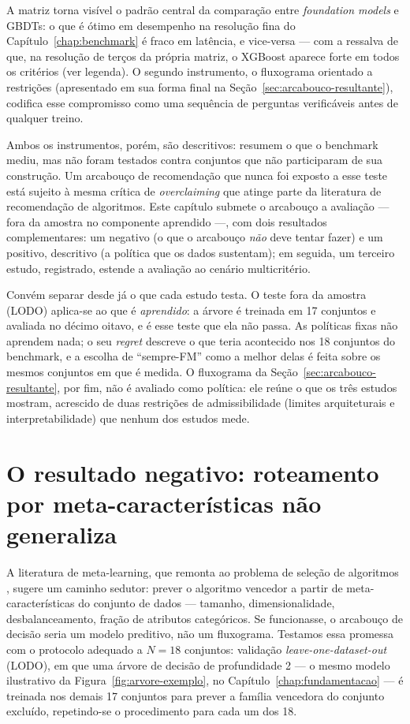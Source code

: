 A matriz torna visível o padrão central da comparação entre
\emph{foundation models} e GBDTs: o que é ótimo em desempenho na
resolução fina do Capítulo~\ref{chap:benchmark} é fraco em latência,
e vice-versa --- com a ressalva de que, na resolução de terços da
própria matriz, o XGBoost aparece forte em todos os critérios (ver
legenda). O segundo instrumento, o fluxograma orientado a restrições
(apresentado em sua forma final na Seção~\ref{sec:arcabouco-resultante}),
codifica esse compromisso como uma sequência de perguntas verificáveis
antes de qualquer treino.

Ambos os instrumentos, porém, são descritivos: resumem o que o benchmark
mediu, mas não foram testados contra conjuntos que não participaram de
sua construção. Um arcabouço de recomendação que nunca foi exposto a
esse teste está sujeito à mesma crítica de \emph{overclaiming} que
atinge parte da literatura de recomendação de algoritmos. Este capítulo
submete o arcabouço a avaliação --- fora da amostra no componente
aprendido ---, com dois resultados
complementares: um negativo (o que o arcabouço \emph{não} deve tentar
fazer) e um positivo, descritivo (a política que os dados sustentam);
em seguida, um terceiro estudo, registrado, estende a avaliação
ao cenário multicritério.

Convém separar desde já o que cada estudo testa. O teste fora da
amostra (LODO) aplica-se ao que é \emph{aprendido}: a árvore é
treinada em 17 conjuntos e avaliada no décimo oitavo, e é esse teste
que ela não passa. As políticas fixas não aprendem nada; o seu
\emph{regret} descreve o que teria acontecido nos 18 conjuntos do
benchmark, e a escolha de ``sempre-FM'' como a melhor delas é feita
sobre os mesmos conjuntos em que é medida. O fluxograma da
Seção~\ref{sec:arcabouco-resultante}, por fim, não é avaliado como
política: ele reúne o que os três estudos mostram, acrescido de duas
restrições de admissibilidade (limites arquiteturais e
interpretabilidade) que nenhum dos estudos mede.

\section{O resultado negativo: roteamento por meta-características não
generaliza}
\label{sec:resultado-negativo}

A literatura de meta-learning, que remonta ao problema de seleção de
algoritmos \citep{rice1976}, sugere um caminho sedutor: prever o
algoritmo vencedor a partir de meta-características do conjunto de dados ---
tamanho, dimensionalidade, desbalanceamento, fração de atributos
categóricos. Se funcionasse, o arcabouço de decisão seria um modelo
preditivo, não um fluxograma. Testamos essa promessa com o protocolo
adequado a $N{=}18$ conjuntos: validação
\emph{leave-one-dataset-out} (LODO), em que uma árvore de decisão de
profundidade 2 --- o mesmo modelo ilustrativo da
Figura~\ref{fig:arvore-exemplo}, no
Capítulo~\ref{chap:fundamentacao} --- é treinada nos demais 17 conjuntos para
prever a família vencedora do conjunto excluído, repetindo-se o
procedimento para cada um dos 18.

